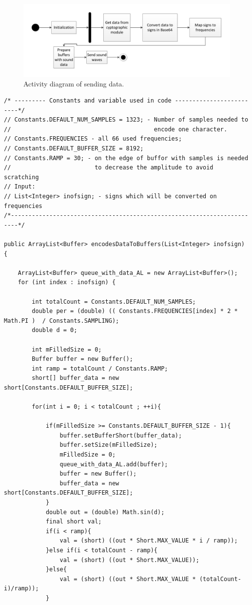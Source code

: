 \documentclass[11pt,titlepage]{article}
\theoremstyle{plain}
\begin{document}
\begin{figure}[H]
	\centering
	\includegraphics[width=1\textwidth]{img/Sending_data_active_diag.pdf}
	\caption{Activity diagram of sending data.}
	\label{fig:F21}
\end{figure}


\begin{minipage}{\linewidth}
\begin{lstlisting}[label={lst:sinus}]
/* --------- Constants and variable used in code -------------------------*/
// Constants.DEFAULT_NUM_SAMPLES = 1323; - Number of samples needed to 	   
//										   encode one character.		   
// Constants.FREQUENCIES - all 66 used frequencies;						   
// Constants.DEFAULT_BUFFER_SIZE = 8192;								   
// Constants.RAMP = 30; - on the edge of buffor with samples is needed     
//						  to decrease the amplitude to avoid scratching    
// Input:																   
// List<Integer> inofsign; - signs which will be converted on frequencies  
/*------------------------------------------------------------------------*/

public ArrayList<Buffer> encodesDataToBuffers(List<Integer> inofsign) {

	ArrayList<Buffer> queue_with_data_AL = new ArrayList<Buffer>();
	for (int index : inofsign) {
		
		int totalCount = Constants.DEFAULT_NUM_SAMPLES; 
		double per = (double) (( Constants.FREQUENCIES[index] * 2 * Math.PI )  / Constants.SAMPLING);
		double d = 0;
		
		int mFilledSize = 0;
		Buffer buffer = new Buffer();
		int ramp = totalCount / Constants.RAMP;
		short[] buffer_data = new short[Constants.DEFAULT_BUFFER_SIZE];
		
		for(int i = 0; i < totalCount ; ++i){
		
			if(mFilledSize >= Constants.DEFAULT_BUFFER_SIZE - 1){
				buffer.setBufferShort(buffer_data);
				buffer.setSize(mFilledSize);
				mFilledSize = 0;
				queue_with_data_AL.add(buffer);
				buffer = new Buffer();
				buffer_data = new short[Constants.DEFAULT_BUFFER_SIZE];
			}
			double out = (double) Math.sin(d);
			final short val;
			if(i < ramp){
				val = (short) ((out * Short.MAX_VALUE * i / ramp));
			}else if(i < totalCount - ramp){
				val = (short) ((out * Short.MAX_VALUE));
			}else{
				val = (short) ((out * Short.MAX_VALUE * (totalCount-i)/ramp));
			}
			

\end{lstlisting}
\end{minipage}
\end{document}
